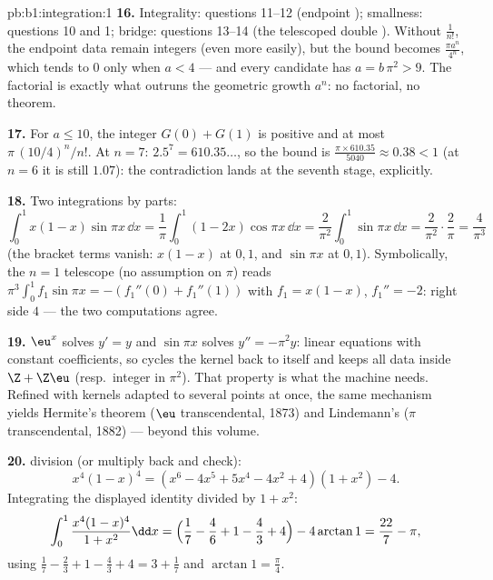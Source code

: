 \begin{solution}{pb:b1:integration:1}
\textbf{16.} Integrality: questions 11--12 (endpoint
); smallness: questions 10 and 1; bridge: questions
13--14 (the telescoped double ). Without
$\frac{1}{n!}$, the endpoint data remain integers (even more
easily), but the bound becomes $\frac{\pi a^n}{4^n}$, which
tends to $0$ only when $a < 4$ --- and every candidate has $a =
b\,\pi^2 > 9$. The factorial is exactly what outruns the
geometric growth $a^n$: no factorial, no theorem.

\textbf{17.} For $a \leq 10$, the integer $G(0) + G(1)$ is
positive and at most $\pi\,(10/4)^n/n!$. At $n = 7$:
$2.5^7 = 610.35\dots$, so the bound is $\frac{\pi \times
610.35}{5040} \approx 0.38 < 1$ (at $n = 6$ it is still
$1.07$): the contradiction lands at the seventh stage,
explicitly.

\textbf{18.} Two integrations by parts:
\[
\int_0^1 x(1-x)\sin\pi x\,\dd x
= \frac1\pi\int_0^1 (1 - 2x)\cos\pi x\,\dd x
= \frac{2}{\pi^2}\int_0^1 \sin\pi x\,\dd x
= \frac{2}{\pi^2}\cdot\frac{2}{\pi} = \frac{4}{\pi^3}
\]
(the bracket terms vanish: $x(1-x)$ at $0, 1$, and $\sin\pi x$
at $0, 1$). Symbolically, the $n = 1$ telescope (no assumption
on $\pi$) reads $\pi^3\int_0^1 f_1\sin\pi x = -(f_1''(0) +
f_1''(1))$ with $f_1 = x(1 - x)$, $f_1'' = -2$: right side $4$
--- the two computations agree.

\textbf{19.} $\eu^x$ solves $y' = y$ and $\sin\pi x$ solves
$y'' = -\pi^2 y$: linear equations with constant coefficients,
so  cycles the kernel back to itself and
keeps all  data inside $\Z + \Z\eu$ (resp.\ integer
 in $\pi^2$). That  property is what the
machine needs. Refined with kernels adapted to several points at
once, the same mechanism yields Hermite's theorem ($\eu$
transcendental, 1873) and Lindemann's ($\pi$ transcendental,
1882) --- beyond this volume.

\textbf{20.}  division (or multiply back and check):
\[
x^4(1-x)^4 = (x^6 - 4x^5 + 5x^4 - 4x^2 + 4)(1 + x^2) - 4 .
\]
Integrating the displayed identity divided by $1 + x^2$:
\[
\int_0^1 \frac{x^4(1-x)^4}{1+x^2}\dd x
= \Bigl(\frac17 - \frac46 + 1 - \frac43 + 4\Bigr)
- 4\arctan 1
= \frac{22}{7} - \pi ,
\]
using $\frac17 - \frac23 + 1 - \frac43 + 4 = 3 + \frac17$ and
$\arctan 1 = \frac\pi4$.


\end{solution}
